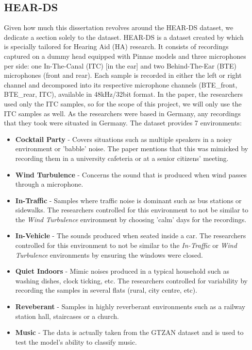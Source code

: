 \documentclass[logo,bsc,singlespacing,parskip,online]{infthesis}
\begin{document}
\subsection{HEAR-DS}
\label{sec:hear-ds}
Given how much this dissertation revolves around the HEAR-DS dataset, we dedicate a section solely 
to the dataset. 
HEAR-DS is a dataset created by \citet{Huwel2020HearDS} which is specially tailored for Hearing Aid (HA) research. 
It consists of recordings captured on a dummy head equipped with Pinnae models and three microphones per side: one In-The-Canal (ITC) [in the ear] and two Behind-The-Ear (BTE) microphones (front and rear).
Each sample is recorded in either the left or right channel and decomposed into its respective microphone channels (BTE\_front, BTE\_rear, ITC), available in 48kHz/32bit format.
In the paper, the researchers used only the ITC samples, so for the scope of this project, we will only use the ITC samples as well. 
As the researchers were based in Germany, any recordings that they took were situated in Germany.
The dataset provides 7 environments:
\begin{itemize}
   \item \textbf{Cocktail Party} - Covers situations such as multiple speakers in a noisy environment or 'babble' noise. The paper mentions that this was mimicked by recording them in a university cafeteria or at a senior citizens' meeting.
   \item \textbf{Wind Turbulence} - Concerns the sound that is produced when wind passes through a microphone.
   \item \textbf{In-Traffic} - Samples where traffic noise is dominant such as bus stations or sidewalks. The researchers controlled for this environment to not be similar to the \textit{Wind Turbulence} environment by choosing 'calm' days for the recordings.
   \item \textbf{In-Vehicle} - The sounds produced when seated inside a car. The researchers controlled for this environment to not be similar to the \textit{In-Traffic} or \textit{Wind Turbulence} environments by ensuring the windows were closed. 
   \item \textbf{Quiet Indoors} - Mimic noises produced in a typical household such as washing dishes, clock ticking, etc. The researchers controlled for variability by recording the samples in several flats (rural, city centre, etc).
   \item \textbf{Reveberant} - Samples in highly reverberant environments such as a railway station hall, staircases or a church. 
   \item \textbf{Music} - The data is actually taken from the GTZAN dataset \cite{tzanetakis_musical_2002} and is used to test the model's ability to classify music.
\end{itemize}
\end{document}
